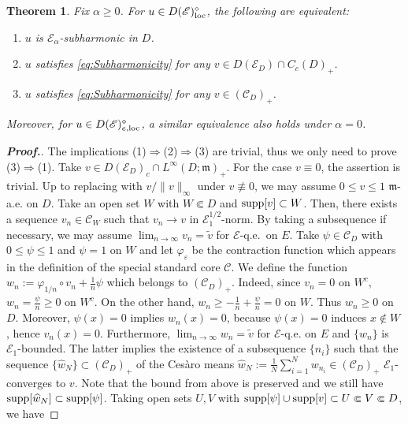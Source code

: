 \documentclass[12pt,a4paper]{article}
\newtheorem{thm}{Theorem}[section]
\newcommand{\supp}{\mathop{\rm supp}\nolimits}
\newcommand{\m}{\mathfrak{m} }
\newcommand{\loc}{{\rm loc}}
\newcommand{\1}{{\bf 1}}
\newcommand{\eps}{{\varepsilon}}
\newcommand{\wh}{\widehat}
\renewcommand{\wh}{\widehat}
\begin{document}
\begin{thm}\label{thm:CharacSubhamonicity}
Fix $\alpha\geq0$. For $u\in 
D(\mathscr{E})_{\loc}^{\diamond}$,
the following are equivalent:
\begin{enumerate}
\item[\rm(1)] $u$ is $\mathscr{E}_{\alpha}$-subharmonic in $D$. 
\item[\rm(2)] $u$ satisfies \eqref{eq:Subharmonicity} for any $v\in D(\mathscr{E}_D)\cap C_c(D)_+$.
\item[\rm(3)] $u$ satisfies \eqref{eq:Subharmonicity} for any $v\in(\mathscr{C}_{D})_+$.
\end{enumerate} 
Moreover, for $u\in 
D(\mathscr{E})_{e,\loc}^{\diamond}$, a similar equivalence also 
holds under $\alpha=0$. 
\end{thm}
\begin{proof}[{\bf Proof.}]
The implications (1)$\Longrightarrow$(2)$\Longrightarrow$(3) are trivial, thus we only need to prove (3)$\Longrightarrow$(1). 
Take $v\in D(\mathscr{E}_D)_c\cap L^{\infty}(D;{\m})_+$.
For the case $v\equiv0$, the assertion is trivial. 
Up to replacing with $v/\|v\|_{\infty}$ under $v\not\equiv0$, we may assume $0\leq v\leq1$ ${\m}$-a.e. on $D$. 
Take an open set $W$ with $W\Subset D$ and ${\rm supp}[v]\subset W$. 
Then, there exists a sequence $v_n\in\mathscr{C}_W$ such that 
$v_n\to v$ in $\mathscr{E}_1^{1/2}$-norm.  
By taking a subsequence if necessary, we may assume $\lim_{n\to\infty}v_n=\tilde{v}$ for $\mathscr{E}$-q.e.~on $E$. 
Take $\psi\in\mathscr{C}_D$ with $0\leq\psi\leq1$ and $\psi=1$ on $W$ and let $\varphi_{\eps}$ be the contraction function which appears in the definition of the special standard core $\mathscr{C}$. 
We define the function $w_n:=\varphi_{1/n}\circ v_n+\frac{1}{n}\psi$ which belongs to $(\mathscr{C}_{D})_+$. 
Indeed, since $v_n=0$ on $W^c$, $w_n=\frac{\psi}{n}\geq0$ on $W^c$. On the other hand, 
$w_n\geq-\frac{1}{n}+\frac{\psi}{n}=0$ on $W$. Thus $w_n\geq0$ on $D$. 
Moreover, $\psi(x)=0$ implies $w_n(x)=0$, because $\psi(x)=0$ induces $x\notin W$, hence $v_n(x)=0$. 
Furthermore, $\lim_{n\to\infty}w_n=\tilde{v}$ for $\mathscr{E}$-q.e. on $E$ and $\{w_n\}$ is $\mathscr{E}_1$-bounded.
The latter implies the existence of a subsequence $\{n_i\}$ such that the sequence $\{\wh{w}_N\}\subset(\mathscr{C}_D)_+$ of the Ces\`aro means $\wh{w}_N:=\frac{1}{N}\sum_{i=1}^Nw_{n_i} \in (\mathscr{C}_D)_+$ $\mathscr{E}_1$-converges to $v$.
Note that the bound from above is preserved and we still have $\supp[\wh{w}_N] \subset \supp[\psi]$.
Taking open sets $U,V$ with $\supp[\psi]\cup{\rm supp}[v]\subset U\Subset V\Subset D$, we have

\end{proof}
\end{document}
